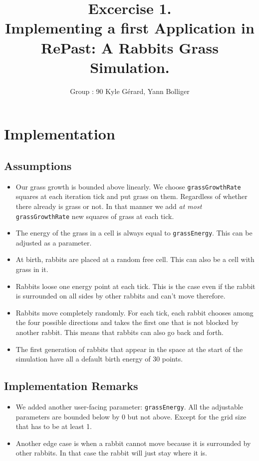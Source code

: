\documentclass[11pt]{article}
\title{\bf Excercise 1.\\ Implementing a first Application in RePast: A Rabbits Grass Simulation.}
\author{Group \textnumero: 90  Kyle Gérard, Yann Bolliger}
\begin{document}
 \maketitle

 \section{Implementation}

\subsection{Assumptions}
\begin{itemize}

\item 
Our grass growth is bounded above linearly. We choose \texttt{grassGrowthRate} 
squares at each iteration tick and put grass on them. Regardless of whether 
there already is grass or not. In that manner we add \textit{at most} \texttt{grassGrowthRate} 
new squares of grass at each tick.

\item 
The energy of the grass in a cell is always equal to \texttt{grassEnergy}.
This can be adjusted as a parameter.

 \item
 At birth, rabbits are placed at a random free cell. This can also be a cell 
 with grass in it.
 
 \item
  Rabbits loose one energy point at each tick. This is the case even if the rabbit is
  surrounded on all sides by other rabbits and can't move therefore.
  
  \item
   Rabbits move completely randomly. For each tick, each rabbit chooses among 
   the four possible directions and takes the first one that is not blocked by 
   another rabbit. This means that rabbits can also go back and forth.
   
   \item
   The first generation of rabbits that appear in the space at the start of the simulation
   have all a default birth energy of 30 points. 
\end{itemize}


 \subsection{Implementation Remarks}
 \begin{itemize}
   
   \item
   We added another user-facing  parameter: \texttt{grassEnergy}. All the 
 adjustable parameters are bounded  below by 0 but not above. Except for the 
 grid size that has to be at least 1.
 
 \item
 Another edge case is when a rabbit cannot move because it is surrounded by 
 other rabbits. In that case the rabbit will just stay where it is.
 
 \end{itemize}
   
\end{document}
